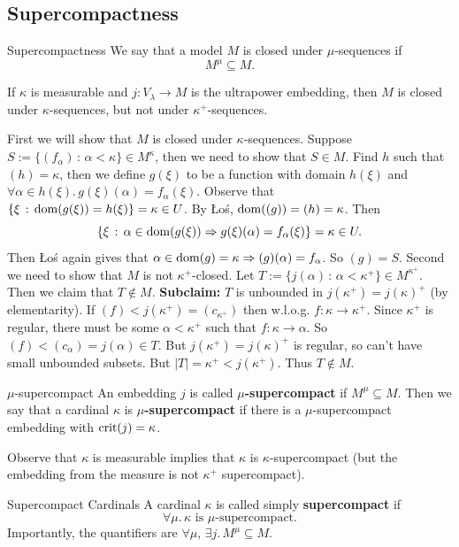 \documentclass{article}
\begin{document}
\subsection{Supercompactness}
\begin{fancydefine}{Supercompactness}
    We say that a model $M$ is closed under $\mu$-sequences if \[ M^{\mu} \subseteq M.\]
\end{fancydefine}
\begin{fancythm}{}
    If $\kappa$ is measurable and $j : V_{\lambda} \to M$ is the ultrapower embedding, then $M$ is closed under $\kappa$-sequences, but not under $\kappa^{+}$-sequences.
\end{fancythm}
\proof First we will show that $M$ is closed under $\kappa$-sequences. Suppose $S := \{ (f_{\alpha}) \, : \, \alpha < \kappa\} \in M^{\kappa}$, then we need to show that $S \in M$. \gap 
Find $h$ such that $(h) = \kappa$, then we define $g(\xi)$ to be a function with domain $h(\xi)$ and $\forall \alpha \in h(\xi). \, g(\xi)(\alpha) = f_{\alpha}(\xi)$. Observe that $\{ \xi \, : \, \operatorname{dom}(g(\xi))= h(\xi)\} = \kappa \in U$. By \L o\'s, $\operatorname{dom}((g))=(h)=\kappa$. Then \[\{ \xi \, : \, \alpha \in \operatorname{dom}(g(\xi)) \Rightarrow g(\xi)(\alpha)=f_{\alpha}(\xi)\} = \kappa \in U.\]
Then \L o\'s again gives that $\alpha \in \operatorname{dom}(g) = \kappa \Rightarrow (g)(\alpha)=f_{\alpha}$. So $(g)=S$. \gap 
Second we need to show that $M$ is not $\kappa^{+}$-closed. Let $T := \{ j(\alpha) \, : \, \alpha <\kappa^{+}\} \in M^{\kappa^{+}}$. Then we claim that $T \notin M$. \gap 
\textbf{Subclaim:} $T$ is unbounded in $j(\kappa^{+})=j(\kappa)^{+}$ (by elementarity). \gap 
If $(f) < j(\kappa^{+}) = (c_{\kappa^{+}})$ then w.l.o.g. $f : \kappa \to \kappa^{+}$. Since $\kappa^{+}$ is regular, there must be some $\alpha < \kappa^{+}$ such that $f: \kappa \to \alpha$. So $(f) < (c_{\alpha}) = j(\alpha) \in T$. But $j(\kappa^{+}) = j(\kappa)^{+}$ is regular, so can't have small unbounded subsets. But $|T| = \kappa^{+} < j(\kappa^{+})$. Thus $T \notin M$. \endproof 
\begin{fancydefine}{$\mu$-supercompact}
    An embedding $j$ is called $\mu$\textbf{-supercompact} if $M^{\mu} \subseteq M$.\gap
    Then we say that a cardinal $\kappa$ is $\mu$\textbf{-supercompact} if there is a $\mu$-supercompact embedding  with $\operatorname{crit}(j)=\kappa$.
\end{fancydefine}
Observe that $\kappa$ is measurable implies that $\kappa$ is $\kappa$-supercompact (but the embedding from the measure is not $\kappa^{+}$ supercompact).\gap 
\begin{fancydefine}{Supercompact Cardinals}
    A cardinal $\kappa$ is called simply \textbf{supercompact} if \[ \forall \mu. \, \kappa \text{ is $\mu$-supercompact.}\]
    Importantly, the quantifiers are $\forall \mu, \, \exists j. \, M^{\mu} \subseteq M$.
\end{fancydefine}
\end{document}
